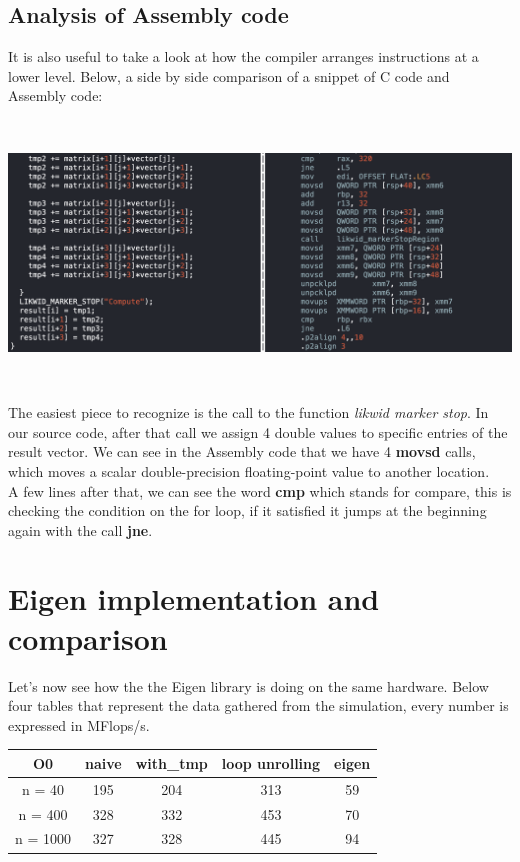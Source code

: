 \documentclass[11pt,a4paper,oneside,titlepage,openright]{book}
\begin{document}
\section{Analysis of Assembly code} 
It is also useful to take a look at how the compiler arranges instructions at a lower level. Below, a side by side comparison of a snippet of C code and Assembly code: 
\begin{center}
\includegraphics[width=14cm, height=7cm]{assembly_screen}
\end{center}
The easiest piece to recognize is the call to the function \textit{likwid marker stop}. In our source code, after that call we assign 4 double values to specific entries of the result vector. We can see in the Assembly code that we have 4 \textbf{movsd} calls, which moves a scalar double-precision floating-point value to another location.\\ A few lines after that, we can see the word \textbf{cmp} which stands for compare, this is checking the condition on the for loop, if it satisfied it jumps at the beginning again with the call \textbf{jne}.

\chapter{Eigen implementation and comparison}

Let's now see how the the Eigen library is doing on the same hardware. 
Below four tables that represent the data gathered from the simulation, every number is expressed in MFlops/s.

\begin{center}
 \begin{tabular}{|c c c c c |} 
 \hline
 O0 & naive   & with\_tmp & loop unrolling & eigen \\ [0.5ex] 
 \hline
 n = 40 & 195   & 204       & 313          & 59    \\ 
 \hline
 n = 400 & 328   & 332       & 453                 & 70       \\
 \hline
 n = 1000 & 327  & 328    &  445            & 94   \\
 \hline
\end{tabular}
\end{center}
\end{document}

